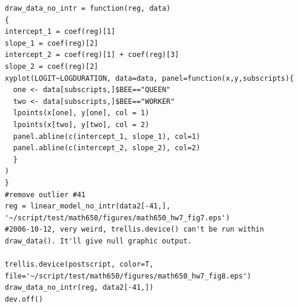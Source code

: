 \documentclass[a4paper,10pt]{article}
\begin{document}
\begin{verbatim}
draw_data_no_intr = function(reg, data)
{
intercept_1 = coef(reg)[1]
slope_1 = coef(reg)[2]
intercept_2 = coef(reg)[1] + coef(reg)[3]
slope_2 = coef(reg)[2]
xyplot(LOGIT~LOGDURATION, data=data, panel=function(x,y,subscripts){
  one <- data[subscripts,]$BEE=="QUEEN"
  two <- data[subscripts,]$BEE=="WORKER"
  lpoints(x[one], y[one], col = 1)
  lpoints(x[two], y[two], col = 2)
  panel.abline(c(intercept_1, slope_1), col=1)
  panel.abline(c(intercept_2, slope_2), col=2)
  }
)
}
#remove outlier #41
reg = linear_model_no_intr(data2[-41,], '~/script/test/math650/figures/math650_hw7_fig7.eps')
#2006-10-12, very weird, trellis.device() can't be run within draw_data(). It'll give null graphic output.

trellis.device(postscript, color=T, file='~/script/test/math650/figures/math650_hw7_fig8.eps')
draw_data_no_intr(reg, data2[-41,])
dev.off()
\end{verbatim}
\end{document}

